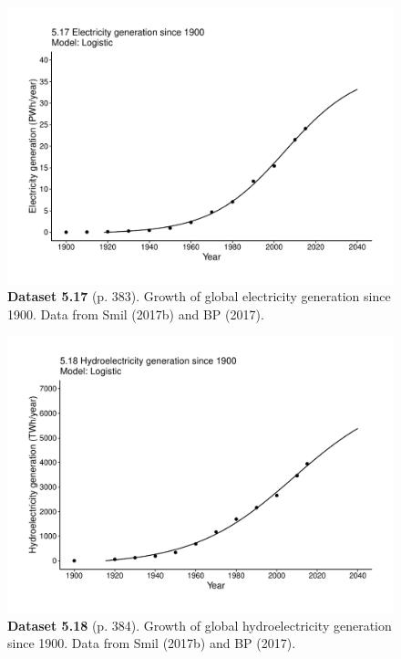 \documentclass[aps,rmp,preprint,superscriptaddress,10pt,onecolumn]{article}
\begin{document}
\clearpage
\begin{figure}[h]
\includegraphics[width=\textwidth]{output/figs-ggplot/5.17.pdf}
\caption*{\textbf{Dataset 5.17} (p. 383). Growth of global electricity generation since 1900. Data from Smil (2017b) and BP (2017). }
\end{figure}
	
\clearpage
\begin{figure}[h]
\includegraphics[width=\textwidth]{output/figs-ggplot/5.18.pdf}
\caption*{\textbf{Dataset 5.18} (p. 384). Growth of global hydroelectricity generation since 1900. Data from Smil (2017b) and BP (2017).}
\end{figure}
	
\end{document}
